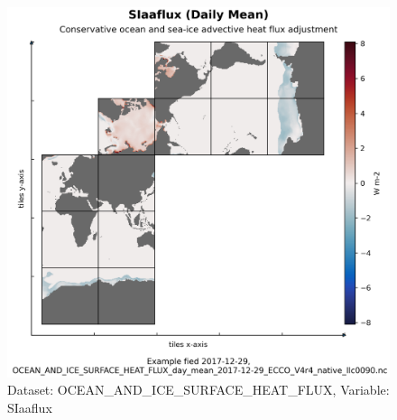 \begin{figure}[H]
\centering
\includegraphics[scale=0.55]{../images/plots/native_plots/Ocean_and_Sea-Ice_Surface_Heat_Fluxes/SIaaflux.png}
\caption{Dataset: OCEAN\_AND\_ICE\_SURFACE\_HEAT\_FLUX, Variable: SIaaflux}
\label{tab:table-OCEAN_AND_ICE_SURFACE_HEAT_FLUX_SIaaflux-Plot}
\end{figure}
\pagebreak
